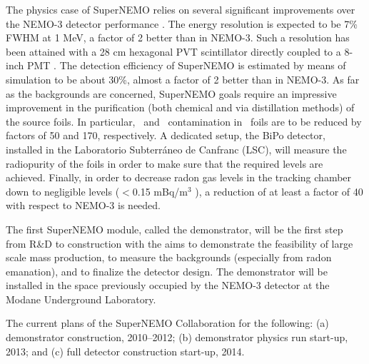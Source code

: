 The physics case of SuperNEMO relies on several significant improvements over the NEMO-3 detector performance \cite{Shitov:2010nt}. The energy resolution is expected to be 7\% FWHM at 1 MeV, a factor of 2 better than in NEMO-3. Such a resolution has been attained with a 28 cm hexagonal PVT scintillator directly coupled to a 8-inch PMT \cite{Freshville:2011zz}. The detection efficiency of SuperNEMO is estimated by means of simulation to be about 30\%, almost a factor of 2 better than in NEMO-3. As far as the backgrounds are concerned, SuperNEMO goals require an impressive improvement in the purification (both chemical and via distillation methods) of the source foils. In particular, \BI\ and \TL\ contamination in \SE\ foils are to be reduced by factors of 50 and 170, respectively. A dedicated setup, the BiPo detector, installed in the Laboratorio Subterr\'aneo de Canfranc (LSC), will measure the radiopurity of the foils in order to make sure that the required levels are achieved. Finally, in order to decrease radon gas levels in the tracking chamber down to negligible levels ($<$0.15 mBq/m$^3$ ), a reduction of at least a factor of 40 with respect to NEMO-3 is needed. 

The first SuperNEMO module, called the demonstrator, will be the first step from R\&D to construction with the aims to demonstrate the feasibility of large scale mass production, to measure the backgrounds (especially from radon emanation), and to finalize the detector design. The demonstrator will be installed in the space previously occupied by the NEMO-3 detector at the Modane Underground Laboratory.

The current plans of the SuperNEMO Collaboration for the following: (a) demonstrator construction, 2010--2012; (b) demonstrator physics run start-up, 2013; and (c) full detector construction start-up, 2014. 